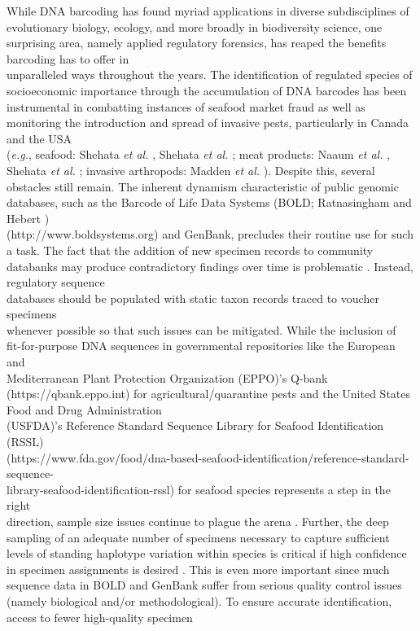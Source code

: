 While DNA barcoding has found myriad applications in diverse subdisciplines of \\ evolutionary biology, ecology, and more broadly in biodiversity science, one surprising area, namely applied regulatory forensics, has reaped the benefits barcoding has to offer in \\ unparalleled ways throughout the years. The identification of regulated species of \\ socioeconomic importance through the accumulation of DNA barcodes has been \\ instrumental in combatting instances of seafood market fraud as well as monitoring the introduction and spread of invasive pests, particularly in Canada and the USA \\ (\textit{e.g.}, seafood: Shehata \textit{et al.} \cite{shehata2018dna}, Shehata \textit{et al.} \cite{shehata2019survey}; meat products: Naaum \textit{et al.} \cite{naaum2018complementary}, Shehata \textit{et al.} \cite{shehata2019revisiting}; invasive arthropods: Madden \textit{et al.} \cite{madden2019using}). Despite this, several obstacles still remain. The inherent dynamism characteristic of public genomic databases, such as the Barcode of Life Data Systems (BOLD; Ratnasingham and Hebert \cite{ratnasingham2007bold}) \\ (http://www.boldsystems.org) and GenBank, precludes their routine use for such a task. The fact that the addition of new specimen records to community databanks may produce contradictory findings over time is problematic \cite{phillips2020hacsim}. Instead, regulatory sequence \\ databases should be populated with static taxon records traced to voucher specimens \\ whenever possible so that such issues can be mitigated. While the inclusion of \\ fit-for-purpose DNA sequences in governmental repositories like the European and \\ Mediterranean Plant Protection Organization (EPPO)'s Q-bank (https://qbank.eppo.int) for agricultural/quarantine pests and the United States Food and Drug Administration \\ (USFDA)'s Reference Standard Sequence Library for Seafood Identification (RSSL) \\ (https://www.fda.gov/food/dna-based-seafood-identification/reference-standard-sequence-\\library-seafood-identification-rssl) for seafood species represents a step in the right \\ direction, sample size issues continue to plague the arena \cite{phillips2020hacsim}. Further, the deep sampling of an adequate number of specimens necessary to capture sufficient levels of standing haplotype variation within species is critical if high confidence in specimen assignments is desired \cite{doorenweerd2020highly, phillips2019incomplete, phillips2020hacsim, phillips2015exploration}. This is even more important since much sequence data in BOLD and GenBank suffer from serious quality control issues (namely biological and/or methodological). To ensure accurate identification, access to fewer high-quality specimen 